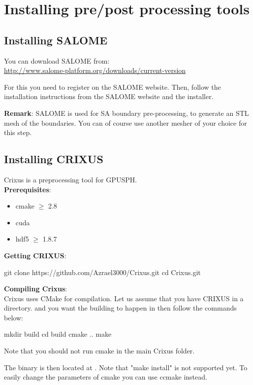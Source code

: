 \documentclass{../GPUSPHtemplate}
\begin{document}
\section{Installing pre/post processing tools}

\subsection{Installing SALOME}
You can download SALOME from:\\
\url{http://www.salome-platform.org/downloads/current-version}

For this you need to register on the SALOME website.
Then, follow the installation instructions from the SALOME website and the
installer.

\textbf{Remark}: SALOME is used for SA boundary pre-processing, to generate an
STL mesh of the boundaries. You can of course use another mesher of your 
choice for this step.

\subsection{Installing CRIXUS}
Crixus is a preprocessing tool for GPUSPH. \\

\textbf{Prerequisites}:
\begin{itemize}
\item cmake $\ge$ 2.8
\item cuda
\item hdf5 $\ge$ 1.8.7
\end{itemize}

\textbf{Getting CRIXUS}:
\begin{shellcode}
git clone https://github.com/Azrael3000/Crixus.git
cd Crixus.git
\end{shellcode}

\textbf{Compiling Crixus}: \\
Crixus uses CMake for compilation. 
Let us assume that you have CRIXUS in a  directory. 
and you want the building to happen in  then follow the commands below:
\begin{shellcode}
mkdir build
cd build
cmake ..
make
\end{shellcode}
Note that you should not run cmake in the main Crixus folder.

The binary is then located at .
Note that "make install" is not supported yet. To easily change the parameters of cmake you can use ccmake instead.
\end{document}
